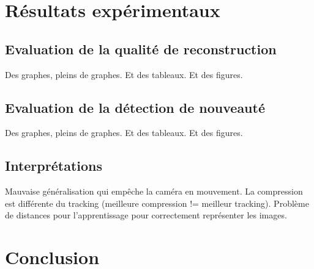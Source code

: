 	\newpage

	\section{Résultats expérimentaux}
	\subsection{Evaluation de la qualité de reconstruction}

	Des graphes, pleins de graphes. Et des tableaux. Et des figures.

	\subsection{Evaluation de la détection de nouveauté}
	
	Des graphes, pleins de graphes. Et des tableaux. Et des figures.

	\subsection{Interprétations}

	Mauvaise généralisation qui empêche la caméra en mouvement. La compression est différente du tracking (meilleure compression != meilleur tracking). Problème de distances pour l'apprentissage pour correctement représenter les images.

	\section{Conclusion}
		

